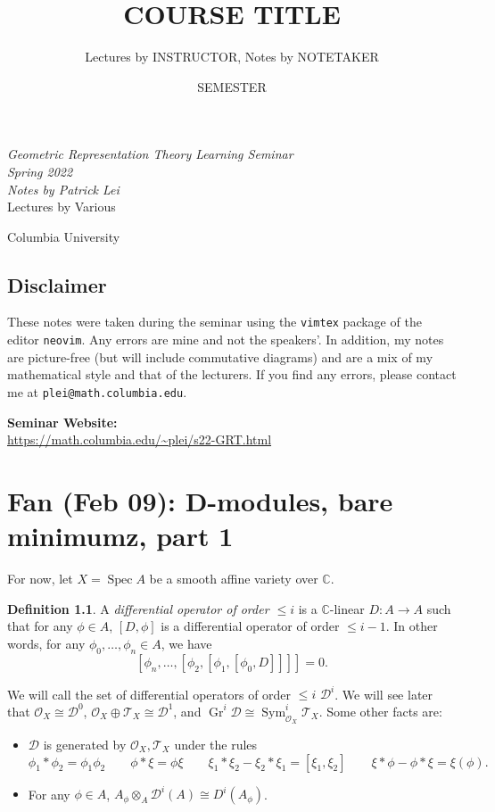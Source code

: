 \documentclass[leqno, openany]{memoir}
\title{COURSE TITLE}
\author{Lectures by INSTRUCTOR, Notes by NOTETAKER}
\date{SEMESTER}
\theoremstyle{definition}
\newtheorem{defn}[thm]{Definition}
\theoremstyle{remark}
\theoremstyle{plain}
\theoremstyle{definition}
\theoremstyle{remark}
\newcommand{\C}{\mathbb{C}}
\newcommand{\mc}[1]{\mathcal{#1}}
\newcommand{\on}[1]{\operatorname{#1}}
\DeclareMathOperator{\Spec}{Spec}
\newcommand*{\titleSW}
    {\begingroup%
    \raggedleft
    \vspace*{\baselineskip}
    {\Huge\itshape Geometric Representation Theory Learning Seminar \\ Spring 2022}\\[\baselineskip]
    {\large\itshape Notes by Patrick Lei}\\[0.2\textheight]
    {\Large Lectures by Various}\par
    \vfill
    {\Large \sffamily Columbia University}
    \vspace*{\baselineskip}
\endgroup}
\begin{document}
    
\begin{titlingpage}
\titleSW
\end{titlingpage}

\thispagestyle{empty}
\section*{Disclaimer}%
\label{sec:disclaimer}

These notes were taken during the seminar using the \texttt{vimtex} package of
the editor \texttt{neovim}.  Any errors are mine and not the speakers'.  In
addition, my notes are picture-free (but will include commutative diagrams) and
are a mix of my mathematical style and that of the lecturers.  If you find any
errors, please contact me at \texttt{plei@math.columbia.edu}.

\vspace*{1cm}

\noindent\textbf{Seminar Website:}\\
\url{https://math.columbia.edu/~plei/s22-GRT.html} \newpage

\tableofcontents

\chapter{Fan (Feb 09): D-modules, bare minimumz, part 1}%

For now, let $X = \Spec A$ be a smooth affine variety over $\C$.

\begin{defn}
    A \textit{differential operator of order $\leq i$} is a $\C$-linear $D \colon A \to A$ such that for any $\phi \in A$, $[D, \phi]$ is a differential operator of order $\leq i-1$. In other words, for any $\phi_0, \ldots, \phi_n \in A$, we have
    \[ [\phi_n, \ldots, [\phi_2, [\phi_1, [\phi_0, D]]]] = 0. \]
\end{defn}
We will call the set of differential operators of order $\leq i$ $\mc{D}^i$. We will see later that $\mc{O}_X \cong \mc{D}^0$, $\mc{O}_X \oplus \mc{T}_X \cong \mc{D}^1$, and $\on{Gr}^i \mc{D} \cong \on{Sym}_{\mc{O}_X}^i \mc{T}_X$. Some other facts are:
\begin{itemize}
    \item $\mc{D}$ is generated by $\mc{O}_X, \mc{T}_X$ under the rules
        \[ \phi_1 * \phi_2 = \phi_1 \phi_2 \qquad \phi * \xi = \phi \xi \qquad \xi_1 * \xi_2 - \xi_2 * \xi_1 = [\xi_1, \xi_2] \qquad \xi * \phi - \phi * \xi = \xi(\phi). \]
    \item For any $\phi \in A$, $A_{\phi} \otimes_A \mc{D}^i(A) \cong D^i(A_{\phi})$.
\end{itemize}
\end{document}

